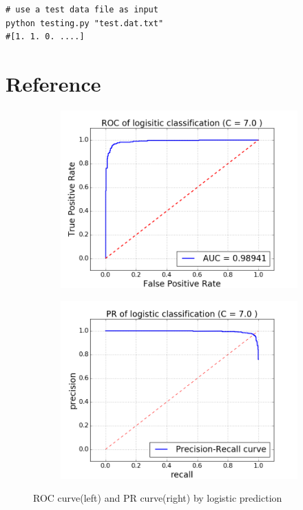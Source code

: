 \documentclass{article}
\begin{document}
\begin{singlespacing}
\begin{lstlisting}
# use a test data file as input
python testing.py "test.dat.txt"
#[1. 1. 0. ....]
\end{lstlisting}

\newpage
\section{Reference}

\begin{figure}[H]
    \centering
    \begin{subfigure}[b]{0.4\textwidth}
        \includegraphics[width=\textwidth]{logistic_roc.png}
    \end{subfigure}
    \begin{subfigure}[b]{0.4\textwidth}
        \includegraphics[width=\textwidth]{logistic_pr.png}
    \end{subfigure}
    \caption{ROC curve(left) and PR curve(right) by logistic prediction}\label{fig:logit}
\end{figure}


\end{singlespacing}
\end{document}
